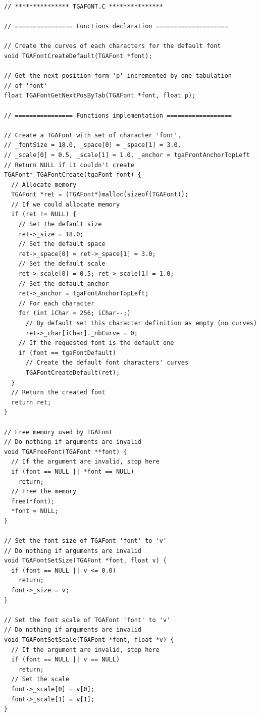 \documentclass[12pt, a4paper]{article}
\begin{document}
\begin{scriptsize}
\begin{ttfamily}
\begin{lstlisting}
// *************** TGAFONT.C ***************

// ================ Functions declaration ====================

// Create the curves of each characters for the default font
void TGAFontCreateDefault(TGAFont *font);

// Get the next position form 'p' incremented by one tabulation
// of 'font'
float TGAFontGetNextPosByTab(TGAFont *font, float p);

// ================ Functions implementation ==================

// Create a TGAFont with set of character 'font', 
// _fontSize = 18.0, _space[0] = _space[1] = 3.0, 
// _scale[0] = 0.5, _scale[1] = 1.0, _anchor = tgaFrontAnchorTopLeft
// Return NULL if it couldn't create
TGAFont* TGAFontCreate(tgaFont font) {
  // Allocate memory
  TGAFont *ret = (TGAFont*)malloc(sizeof(TGAFont));
  // If we could allocate memory
  if (ret != NULL) {
    // Set the default size
    ret->_size = 18.0;
    // Set the default space
    ret->_space[0] = ret->_space[1] = 3.0;
    // Set the default scale
    ret->_scale[0] = 0.5; ret->_scale[1] = 1.0;
    // Set the default anchor
    ret->_anchor = tgaFontAnchorTopLeft;
    // For each character
    for (int iChar = 256; iChar--;)
      // By default set this character definition as empty (no curves)
      ret->_char[iChar]._nbCurve = 0;
    // If the requested font is the default one
    if (font == tgaFontDefault)
      // Create the default font characters' curves
      TGAFontCreateDefault(ret);
  }
  // Return the created font
  return ret;
}

// Free memory used by TGAFont
// Do nothing if arguments are invalid
void TGAFreeFont(TGAFont **font) {
  // If the argument are invalid, stop here
  if (font == NULL || *font == NULL)
    return;
  // Free the memory
  free(*font);
  *font = NULL;
}

// Set the font size of TGAFont 'font' to 'v'
// Do nothing if arguments are invalid
void TGAFontSetSize(TGAFont *font, float v) {
  if (font == NULL || v <= 0.0)
    return;
  font->_size = v;
}

// Set the font scale of TGAFont 'font' to 'v'
// Do nothing if arguments are invalid
void TGAFontSetScale(TGAFont *font, float *v) {
  // If the argument are invalid, stop here
  if (font == NULL || v == NULL)
    return;
  // Set the scale
  font->_scale[0] = v[0];  
  font->_scale[1] = v[1];  
}


\end{lstlisting}
\end{ttfamily}
\end{scriptsize}
\end{document}
